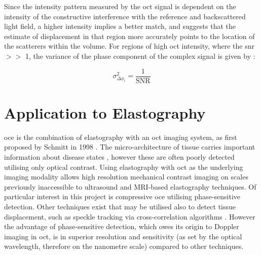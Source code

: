 Since the intensity pattern measured by the \ac{oct} signal is dependent on the intensity of the constructive interference with the reference and backscattered light field, a higher intensity implies a better match, and suggests that the estimate of displacement in that region more accurately points to the location of the scatterers within the volume. For regions of high \ac{oct} intensity, where the \ac{snr} $>>$ 1, the variance of the phase component of the complex signal is given by \cite{goodman_statistical_2015}:

\begin{equation}
	\sigma^2_{\Delta\phi_i} = \frac{1}{\text{SNR}}
	\label{snr_variance}
\end{equation}

\section{Application to Elastography}\label{application_elastography}

\ac{oce} is the combination of elastography with an \ac{oct} imaging system, as first proposed by Schmitt in 1998 \cite{schmitt_oct_1998}. The micro-architecture of tissue carries important information about disease states \cite{fung_biomechanics_1981}, however these are often poorly detected utilising only optical contrast. Using elastography with \ac{oct} as the underlying imaging modality allows high resolution mechanical contrast imaging on scales previously inaccessible to ultrasound and MRI-based elastography techniques. Of particular interest in this project is compressive \ac{oce} utilising phase-sensitive detection. Other techniques exist that may be utilised also to detect tissue displacement, such as speckle tracking via cross-correlation algorithms \cite{kennedy_review_2014}. However the advantage of phase-sensitive detection, which owes its origin to Doppler imaging in \ac{oct}, is in superior resolution and sensitivity (as set by the optical wavelength, therefore on the nanometre scale) compared to other techniques. 

